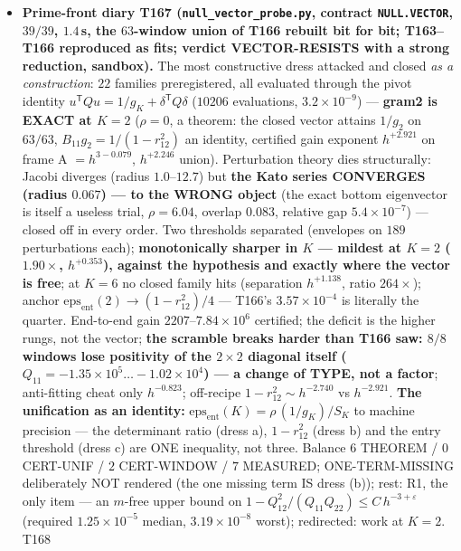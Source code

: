 \documentclass[11pt]{article}
\begin{document}
\begin{itemize}[leftmargin=1.5em]
\texttt{PRIME.CASCADE.VECT.01}; registered in \texttt{run\_all.py} and
\texttt{script\_registry.csv}; suite counter $550\to551$ scripts.
\item \textbf{Prime-front diary T167 (\texttt{null\_vector\_probe.py}, contract
\texttt{NULL.VECTOR}, $39/39$, $1.4$\,s, the $63$-window union of T166 rebuilt bit for
bit; T163--T166 reproduced as fits; verdict VECTOR-RESISTS with a strong reduction,
sandbox).} The most constructive dress attacked and closed \emph{as a construction}:
$22$ families preregistered, all evaluated through the pivot identity
$u^{\mathsf T}Qu=1/g_K+\delta^{\mathsf T}Q\delta$ ($10206$ evaluations,
$3.2\times10^{-9}$) --- \textbf{gram2 is EXACT at $K=2$} ($\rho=0$, a theorem: the
closed vector attains $1/g_2$ on $63/63$, $B_{11}g_2=1/(1-r_{12}^2)$ an identity,
certified gain exponent $h^{+2.921}$ on frame A $=h^{3-0.079}$, $h^{+2.246}$ union).
Perturbation theory dies structurally: Jacobi diverges (radius $1.0$--$12.7$) but
\textbf{the Kato series CONVERGES (radius $0.067$) --- to the WRONG object} (the exact
bottom eigenvector is itself a useless trial, $\rho=6.04$, overlap $0.083$, relative
gap $5.4\times10^{-7}$) --- closed off in every order. Two thresholds separated
(envelopes on $189$ perturbations each); \textbf{monotonically sharper in $K$ ---
mildest at $K=2$ ($1.90\times$, $h^{+0.353}$), against the hypothesis and exactly where
the vector is free}; at $K=6$ no closed family hits (separation $h^{+1.138}$, ratio
$264\times$); anchor $\mathrm{eps}_{\mathrm{ent}}(2)\to(1-r_{12}^2)/4$ --- T166's
$3.57\times10^{-4}$ is literally the quarter. End-to-end gain $2207$--$7.84\times10^{6}$
certified; the deficit is the higher rungs, not the vector; \textbf{the scramble breaks
harder than T166 saw: $8/8$ windows lose positivity of the $2\times2$ diagonal itself
($Q_{11}=-1.35\times10^{5}\ldots-1.02\times10^{4}$) --- a change of TYPE, not a
factor}; anti-fitting cheat only $h^{-0.823}$; off-recipe $1-r_{12}^2\sim h^{-2.740}$
vs $h^{-2.921}$. \textbf{The unification as an identity:}
$\mathrm{eps}_{\mathrm{ent}}(K)=\rho\,(1/g_K)/S_K$ to machine precision --- the
determinant ratio (dress a), $1-r_{12}^2$ (dress b) and the entry threshold (dress c)
are ONE inequality, not three. Balance $6$ THEOREM / $0$ CERT-UNIF / $2$ CERT-WINDOW /
$7$ MEASURED; ONE-TERM-MISSING deliberately NOT rendered (the one missing term IS dress
(b)); rest: R1, the only item --- an $m$-free upper bound on
$1-Q_{12}^2/(Q_{11}Q_{22})\le C\,h^{-3+\varepsilon}$ (required $1.25\times10^{-5}$
median, $3.19\times10^{-8}$ worst); redirected: work at $K=2$. T168

\end{itemize}
\end{document}
